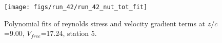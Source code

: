 \begin{figure}[H]
\centering
\texttt{[image: figs/run\_42/run\_42\_nut\_tot\_fit]}
\caption{Polynomial fits of reynolds stress and velocity gradient terms at $z/c$=9.00, $V_{free}$=17.24, station 5.}
\label{fig:run_42_nut_tot_fit}
\end{figure}


